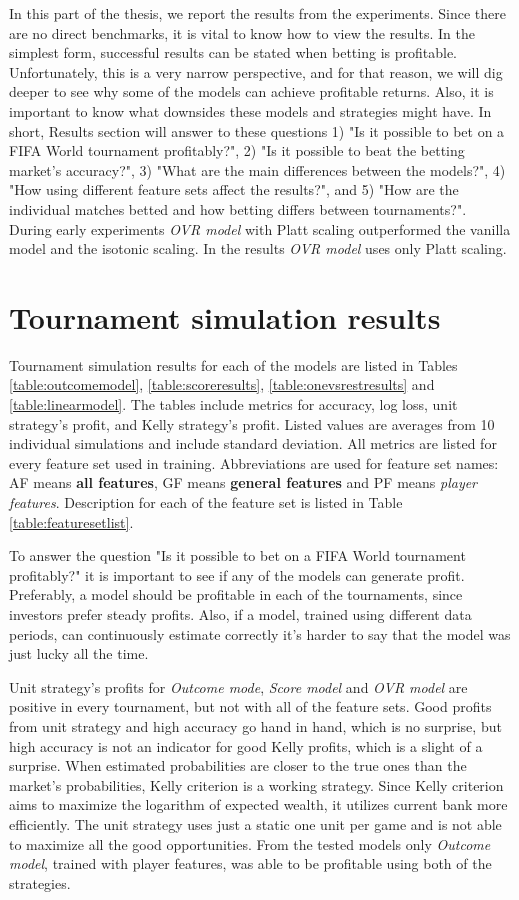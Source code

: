 

In this part of the thesis, we report the results from the experiments. Since there are no direct benchmarks, it is vital to know how to view the results. In the simplest form, successful results can be stated when betting is profitable. Unfortunately, this is a very narrow perspective, and for that reason, we will dig deeper to see why some of the models can achieve profitable returns. Also, it is important to know what downsides these models and strategies might have.  In short, Results section will answer to these questions 1) "Is it possible to bet on a FIFA World tournament profitably?", 2) "Is it possible to beat the betting market's accuracy?", 3) "What are the main differences between the models?", 4) "How using different feature sets affect the results?", and 5) "How are the individual matches betted and how betting differs between tournaments?". During early experiments \textit{OVR model} with Platt scaling outperformed the vanilla model and the isotonic scaling. In the results \textit{OVR model} uses only Platt scaling.

\section{Tournament simulation results}
Tournament simulation results for each of the models are listed in Tables \ref{table:outcomemodel}, \ref{table:scoreresults}, \ref{table:onevsrestresults} and \ref{table:linearmodel}. The tables include metrics for accuracy, log loss, unit strategy's profit, and Kelly strategy's profit. Listed values are averages from 10 individual simulations and include standard deviation. All metrics are listed for every feature set used in training. Abbreviations are used for feature set names: AF means \textbf{all features}, GF means \textbf{general features} and PF means \textit{player features}. Description for each of the feature set is listed in Table \ref{table:featuresetlist}.

To answer the question "Is it possible to bet on a FIFA World tournament profitably?" it is important to see if any of the models can generate profit. Preferably, a model should be profitable in each of the tournaments, since investors prefer steady profits. Also, if a model, trained using different data periods, can continuously estimate correctly it's harder to say that the model was just lucky all the time.

Unit strategy's profits for \textit{Outcome mode}, \textit{Score model} and \textit{OVR model} are positive in every tournament, but not with all of the feature sets. Good profits from unit strategy and high accuracy go hand in hand, which is no surprise, but high accuracy is not an indicator for good Kelly profits, which is a slight of a surprise. When estimated probabilities are closer to the true ones than the market's probabilities, Kelly criterion is a working strategy. Since Kelly criterion aims to maximize the logarithm of expected wealth, it utilizes current bank more efficiently. The unit strategy uses just a static one unit per game and is not able to maximize all the good opportunities. From the tested models only \textit{Outcome model}, trained with player features, was able to be profitable using both of the strategies.

